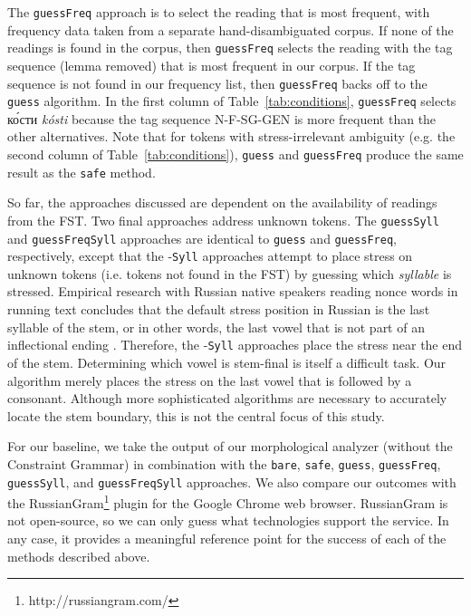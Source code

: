 \documentclass[11pt]{article}
\newcommand{\rus}[1]{\foreignlanguage{russian}{#1}}
\begin{document}
The {\small {\tt guessFreq}} 
approach is to select the reading that is most frequent, with frequency data
taken from a separate hand-disambiguated corpus. If none of the readings is 
found in the corpus, then {\small {\tt guessFreq}} selects the reading
with the tag sequence (lemma removed) that is most frequent in our corpus. If the 
tag sequence is not found
in our frequency list, then {\small {\tt guessFreq}} backs off to the 
{\small {\tt guess}} algorithm. In the first column of
Table~\ref{tab:conditions}, {\small {\tt guessFreq}} selects \rus{к\'{о}сти} 
\emph{k\'{o}sti} because the tag sequence N-F-SG-GEN is more frequent than the
other alternatives. Note 
that for tokens with stress-irrelevant ambiguity (e.g. the second column of
Table~\ref{tab:conditions}), {\small {\tt guess}} and 
{\small {\tt guessFreq}} produce the same result as the {\small {\tt safe}} 
method.

So far, the approaches discussed are
dependent on the availability of readings from the FST. Two final approaches 
address unknown tokens.
The {\small {\tt guessSyll}} and {\small {\tt guessFreqSyll}} approaches are 
identical to {\small {\tt guess}} and {\small {\tt guessFreq}}, respectively,
except that the -{\small {\tt Syll}} approaches attempt to place stress on
unknown tokens (i.e. tokens not found in the FST) by guessing which 
\emph{syllable} is stressed. Empirical research with
Russian native speakers reading nonce words in running text concludes that
the default stress position in Russian is the last syllable of the stem, or
in other words, the last vowel that is not part of an inflectional ending 
\cite{Crosswhite.ea-03}. Therefore, the -{\small {\tt Syll}} approaches 
place the stress near the end of the stem. Determining 
which vowel is stem-final
is itself a difficult task. Our algorithm merely places the stress on the last 
vowel that is followed by a consonant. Although more sophisticated algorithms
are necessary to accurately locate the stem boundary, this is not the central
focus of this study.

For our baseline, we take the output of our morphological analyzer (without the 
Constraint Grammar) in combination with the {\small {\tt bare}}, 
{\small {\tt safe}}, {\small {\tt guess}}, {\small {\tt guessFreq}}, 
{\small {\tt guessSyll}}, and {\small {\tt guessFreqSyll}} approaches. We also 
compare our outcomes with the RussianGram\footnote{http://russiangram.com/} 
plugin for the Google Chrome web browser. RussianGram is not open-source, so we
can only guess what technologies support the service. In any case, it provides a
meaningful reference point for the success of each of the methods described 
above.
\end{document}
